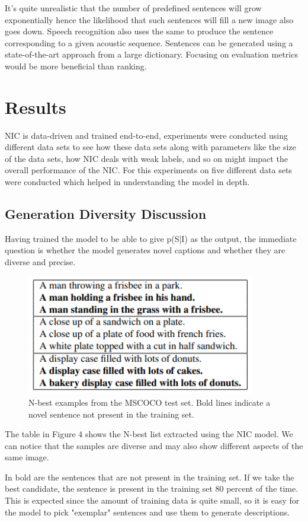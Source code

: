 \documentclass[a4paper,UKenglish,cleveref, autoref, thm-restate]{lipics-v2021}
\begin{document}
It’s quite unrealistic that the number of predefined sentences will grow exponentially hence the likelihood that such sentences will fill a new image also goes down.
Speech recognition also uses the same to produce the sentence corresponding to a given acoustic sequence. Sentences can be generated using a state-of-the-art approach from a large dictionary. Focusing on evaluation metrics would be more beneficial than ranking.

\section{Results}
NIC is data-driven and trained end-to-end, experiments were conducted using different data sets to see how these data sets along with parameters like the size of the data sets, how NIC deals with weak labels, and so on might impact the overall performance of the NIC. For this experiments on five different data sets were conducted which helped in understanding the model in depth.

\subsection{Generation Diversity Discussion}
Having trained the model to be able to give p(S|I) as the output, the immediate question is whether the model generates novel captions and whether they are diverse and precise.
\begin{figure}[ht]
    \centering
    \includegraphics[width=10cm]{images/Novel_Samples.png}
    \caption{N-best examples from the MSCOCO test set. Bold lines indicate a novel sentence not present in the training set.}
    \label{fig:}
\end{figure}

The table in Figure 4 shows the N-best list extracted using the NIC model. We can notice that the samples are diverse and may also show different aspects of the same image.

In bold are the sentences that are not present in the training set. If we take the best candidate, the sentence is present in the training set 80 percent of the time. This is expected since the amount of training data is quite small, so it is easy for the model to pick "exemplar" sentences and use them to generate descriptions.
\end{document}
